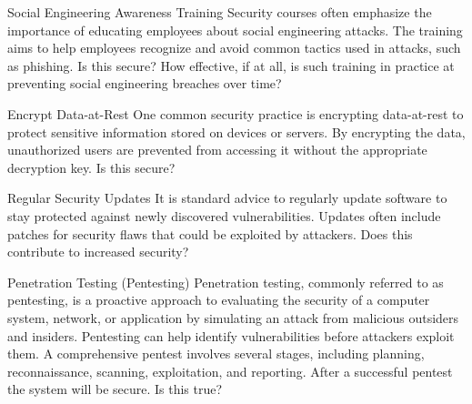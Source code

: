 \begin{frame}\begin{block}{Social Engineering Awareness Training}
Security courses often emphasize the importance of educating employees
about social engineering attacks. The training aims to help employees
recognize and avoid common tactics used in attacks, such as phishing.
Is this secure? How effective, if at all, is such training in practice at 
preventing social engineering breaches over time?
\end{block}\end{frame}

\begin{frame}\begin{block}{Encrypt Data-at-Rest}
One common security practice is encrypting data-at-rest to protect
sensitive information stored on devices or servers. By encrypting the
data, unauthorized users are prevented from accessing it without the
appropriate decryption key. Is this secure?
\end{block}\end{frame}

\begin{frame}\begin{block}{Regular Security Updates}
It is standard advice to regularly update software to stay protected
against newly discovered vulnerabilities. Updates often include patches
for security flaws that could be exploited by attackers. Does this contribute 
to increased security?
\end{block}\end{frame}

\begin{frame}\begin{block}{Penetration Testing (Pentesting)}
Penetration testing, commonly referred to as pentesting, is a proactive
approach to evaluating the security of a computer system, network,
or application by simulating an attack from malicious outsiders and
insiders. Pentesting can help identify vulnerabilities before attackers
exploit them. A comprehensive pentest involves several stages, including
planning, reconnaissance, scanning, exploitation, and reporting. After a 
successful pentest the system will be secure. Is this true?
\end{block}\end{frame}
